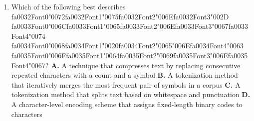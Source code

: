 \documentclass[11pt]{article}
\begin{document}
\begin{enumerate}[leftmargin=*]
  \item Which of the following best describes {\csname fa0032Font0\endcsname\char"0072}{\csname fa0032Font1\endcsname\char"0075}{\csname fa0032Font2\endcsname\char"006E}{\csname fa0032Font3\endcsname\char"002D} {\csname fa0033Font0\endcsname\char"006C}{\csname fa0033Font1\endcsname\char"0065}{\csname fa0033Font2\endcsname\char"006E}{\csname fa0033Font3\endcsname\char"0067}{\csname fa0033Font4\endcsname\char"0074} {\csname fa0034Font0\endcsname\char"0068}{\csname fa0034Font1\endcsname\char"0020}{\csname fa0034Font2\endcsname\char"0065}{\char"006E}{\csname fa0034Font4\endcsname\char"0063} {\csname fa0035Font0\endcsname\char"006F}{\csname fa0035Font1\endcsname\char"0064}{\csname fa0035Font2\endcsname\char"0069}{\csname fa0035Font3\endcsname\char"006E}{\csname fa0035Font4\endcsname\char"0067}?
    \textbf{A.} A technique that compresses text by replacing consecutive repeated characters with a count and a symbol
    \textbf{B.} A tokenization method that iteratively merges the most frequent pair of symbols in a corpus
    \textbf{C.} A tokenization method that splits text based on whitespace and punctuation
    \textbf{D.} A character-level encoding scheme that assigns fixed-length binary codes to characters


\end{enumerate}
\end{document}
